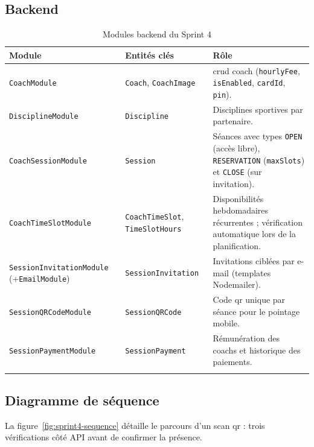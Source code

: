 ﻿\documentclass[../main.tex]{subfiles}
\begin{document}
\subsection{Backend}

\begin{longtable}{|>{\footnotesize}p{4.5cm}|>{\footnotesize}p{3.6cm}|p{5.6cm}|}
\hline
\textbf{Module} & \textbf{Entit\'{e}s cl\'{e}s} & \textbf{R\^{o}le} \\
\hline
\endfirsthead
\hline
\endfoot
\texttt{CoachModule} & \texttt{Coach}, \texttt{CoachImage} & \acrshort{crud} coach (\texttt{hourlyFee}, \texttt{isEnabled}, \texttt{cardId}, \texttt{pin}). \\
\hline
\texttt{DisciplineModule} & \texttt{Discipline} & Disciplines sportives par partenaire. \\
\hline
\texttt{CoachSessionModule} & \texttt{Session} & S\'{e}ances avec types \texttt{OPEN} (acc\`{e}s libre), \texttt{RESERVATION} (\texttt{maxSlots}) et \texttt{CLOSE} (sur invitation). \\
\hline
\texttt{CoachTimeSlotModule} & \texttt{CoachTimeSlot}, \texttt{TimeSlotHours} & Disponibilit\'{e}s hebdomadaires r\'{e}currentes ; v\'{e}rification automatique lors de la planification. \\
\hline
\texttt{SessionInvitationModule} (+\texttt{EmailModule}) & \texttt{SessionInvitation} & Invitations cibl\'{e}es par e-mail (templates Nodemailer). \\
\hline
\texttt{SessionQRCodeModule} & \texttt{SessionQRCode} & Code \acrshort{qr} unique par s\'{e}ance pour le pointage mobile. \\
\hline
\texttt{SessionPaymentModule} & \texttt{SessionPayment} & R\'{e}mun\'{e}ration des coachs et historique des paiements. \\
\hline
\caption{Modules backend du Sprint 4}
\end{longtable}

\subsection{Diagramme de s\'{e}quence}

La figure~\ref{fig:sprint4-sequence} d\'{e}taille le parcours d'un scan \acrshort{qr} : trois v\'{e}rifications c\^{o}t\'{e} API avant de confirmer la pr\'{e}sence.
\end{document}

